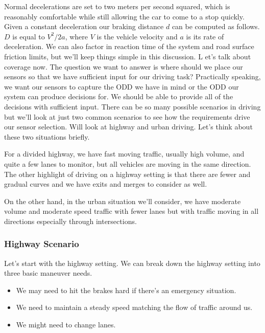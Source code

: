 Normal decelerations are set to two meters per second squared, which is reasonably comfortable while still allowing the car to come to a stop quickly. 
Given a constant deceleration our braking distance $d$ can be computed as follows. $D$ is equal to $V^2/2a$, where $V$ is the vehicle velocity and 
$a$ is its rate of deceleration. We can also factor in reaction time of the system and road surface friction limits, but we'll keep things simple in this discussion. L
et's talk about coverage now. The question we want to answer is where should we place our sensors so that we have sufficient input for our driving task? 
Practically speaking, we want our sensors to capture the ODD we have in mind or the ODD our system can produce decisions for. 
We should be able to provide all of the decisions with sufficient input. 
There can be so many possible scenarios in driving but we'll look at just two common scenarios to see how the requirements drive our sensor selection. 
Will look at highway and urban driving. Let's think about these two situations briefly. 


For a divided highway, we have fast moving traffic, usually high volume, and quite a few lanes to monitor, 
but all vehicles are moving in the same direction. The other highlight of driving on a highway setting is that there are 
fewer and gradual curves and we have exits and merges to consider as well. 

On the other hand, in the urban situation we'll consider, 
we have moderate volume and moderate speed traffic with fewer lanes but with 
traffic moving in all directions especially through intersections. 

\subsubsection{Highway Scenario}

Let's start with the highway setting. 
We can break down the highway setting into three basic maneuver needs. 

\begin{itemize}
\item We may need to hit the brakes hard if there's an emergency situation. 
\item We need to maintain a steady speed matching the flow of traffic around us.
\item We might need to change lanes. 
\end{itemize}

